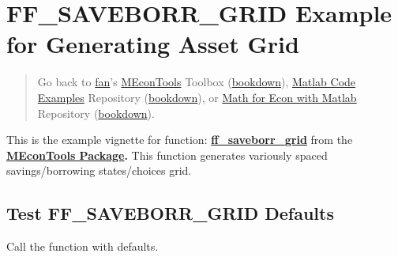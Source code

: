 \documentclass[
]{book}
\begin{document}
\hypertarget{ff_saveborr_grid-example-for-generating-asset-grid}{%
\section{FF\_SAVEBORR\_GRID Example for Generating Asset Grid}\label{ff_saveborr_grid-example-for-generating-asset-grid}}

\begin{quote}
Go back to \href{http://fanwangecon.github.io/}{fan}'s \href{https://fanwangecon.github.io/MEconTools/}{MEconTools} Toolbox (\href{https://fanwangecon.github.io/MEconTools/bookdown}{bookdown}), \href{https://fanwangecon.github.io/M4Econ/}{Matlab Code Examples} Repository (\href{https://fanwangecon.github.io/M4Econ/bookdown}{bookdown}), or \href{https://fanwangecon.github.io/Math4Econ/}{Math for Econ with Matlab} Repository (\href{https://fanwangecon.github.io/Math4Econ/bookdown}{bookdown}).
\end{quote}

This is the example vignette for function:
\href{https://github.com/FanWangEcon/MEconTools/blob/master/MEconTools/generate/ff_saveborr_grid.m}{\textbf{ff\_saveborr\_grid}}
from the \href{https://fanwangecon.github.io/MEconTools/}{\textbf{MEconTools
Package}}\textbf{.} This function
generates variously spaced savings/borrowing states/choices grid.

\hypertarget{test-ff_saveborr_grid-defaults}{%
\subsection{Test FF\_SAVEBORR\_GRID Defaults}\label{test-ff_saveborr_grid-defaults}}

Call the function with defaults.
\end{document}
